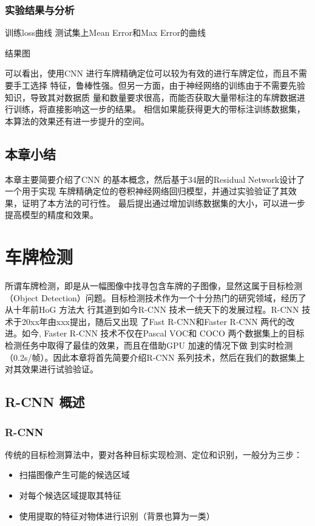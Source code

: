 \subsection{实验结果与分析}

训练loss曲线
测试集上Mean Error和Max Error的曲线

结果图

可以看出，使用CNN 进行车牌精确定位可以较为有效的进行车牌定位，而且不需要手工选择
特征，鲁棒性强。但另一方面，由于神经网络的训练由于不需要先验知识，导致其对数据质
量和数量要求很高，而能否获取大量带标注的车牌数据进行训练，将直接影响这一步的结果。
相信如果能获得更大的带标注训练数据集，本算法的效果还有进一步提升的空间。

\section{本章小结}

本章主要简要介绍了CNN 的基本概念，然后基于34层的Residual Network设计了一个用于实现
车牌精确定位的卷积神经网络回归模型，并通过实验验证了其效果，证明了本方法的可行性。
最后提出通过增加训练数据集的大小，可以进一步提高模型的精度和效果。

\chapter{车牌检测}

所谓车牌检测，即是从一幅图像中找寻包含车牌的子图像，显然这属于目标检测（Object
Detection）问题。目标检测技术作为一个十分热门的研究领域，经历了从十年前HoG 方法大
行其道到如今R-CNN 技术一统天下的发展过程。R-CNN 技术于20xx年由xxx提出，随后又出现
了Fast R-CNN和Faster R-CNN 两代的改进。如今, Faster R-CNN 技术不仅在Pascal VOC和
COCO 两个数据集上的目标检测任务中取得了最佳的效果，而且在借助GPU 加速的情况下做
到实时检测（0.2s/帧）。因此本章将首先简要介绍R-CNN 系列技术，然后在我们的数据集上
对其效果进行试验验证。

\section{R-CNN 概述}

\subsection{R-CNN}

传统的目标检测算法中，要对各种目标实现检测、定位和识别，一般分为三步：

\begin{itemize}
  \item 扫描图像产生可能的候选区域
  \item 对每个候选区域提取其特征
  \item 使用提取的特征对物体进行识别（背景也算为一类）
\end{itemize}

